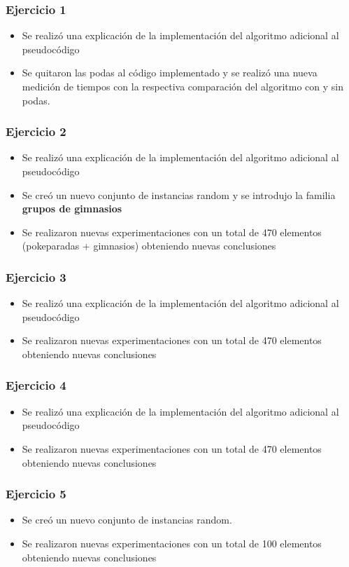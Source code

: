 \subsubsection*{Ejercicio 1}
\begin{itemize}
\item Se realiz\'o una explicaci\'on de la implementaci\'on del algoritmo adicional al pseudoc\'odigo
\item Se quitaron las podas al c\'odigo implementado y se realiz\'o una nueva medici\'on de tiempos con la respectiva comparaci\'on del algoritmo con y sin podas.
\end{itemize}

\subsubsection*{Ejercicio 2}
\begin{itemize}
\item Se realiz\'o una explicaci\'on de la implementaci\'on del algoritmo adicional al pseudoc\'odigo
\item Se creó un nuevo conjunto de instancias random y se introdujo la familia \textbf{grupos de gimnasios}
\item Se realizaron nuevas experimentaciones con un total de 470 elementos (pokeparadas + gimnasios) obteniendo nuevas conclusiones
\end{itemize}

\subsubsection*{Ejercicio 3}
\begin{itemize}
\item Se realiz\'o una explicaci\'on de la implementaci\'on del algoritmo adicional al pseudoc\'odigo
\item Se realizaron nuevas experimentaciones con un total de 470 elementos obteniendo nuevas conclusiones
\end{itemize}

\subsubsection*{Ejercicio 4}
\begin{itemize}
\item Se realiz\'o una explicaci\'on de la implementaci\'on del algoritmo adicional al pseudoc\'odigo
\item Se realizaron nuevas experimentaciones con un total de 470 elementos obteniendo nuevas conclusiones
\end{itemize}

\subsubsection*{Ejercicio 5}
\begin{itemize}
\item Se creó un nuevo conjunto de instancias random.
\item Se realizaron nuevas experimentaciones con un total de 100 elementos obteniendo nuevas conclusiones
\end{itemize}